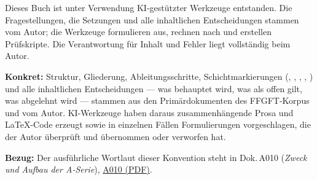
Dieses Buch ist unter Verwendung KI-gestützter Werkzeuge entstanden.
Die Fragestellungen, die Setzungen und alle inhaltlichen Entscheidungen
stammen vom Autor; die Werkzeuge formulieren aus, rechnen nach und erstellen
Prüfskripte. Die Verantwortung für Inhalt und Fehler liegt vollständig
beim Autor.

\medskip\noindent
\textbf{Konkret:} Struktur, Gliederung, Ableitungsschritte, Schicht\-markierungen
(\SETZ, \BB, \QQ, \Skizze, \HH) und alle inhaltlichen Entscheidungen
--- was behauptet wird, was als offen gilt, was abgelehnt wird ---
stammen aus den Primärdokumenten des FFGFT-Korpus und vom Autor.
KI-Werkzeuge haben daraus zusammenhängende Prosa und LaTeX-Code erzeugt
sowie in einzelnen Fällen Formulierungen vorgeschlagen, die der Autor
überprüft und übernommen oder verworfen hat.

\medskip\noindent
\textbf{Bezug:} Der ausführliche Wortlaut dieser Konvention steht in
Dok.\,A010 (\textit{Zweck und Aufbau der A-Serie}),
\href{https://github.com/jpascher/T0-Time-Mass-Duality/blob/main/A_Serie_Export/pdf/A010_Zweck_Aufbau_De.pdf}{A010 (PDF)}.
